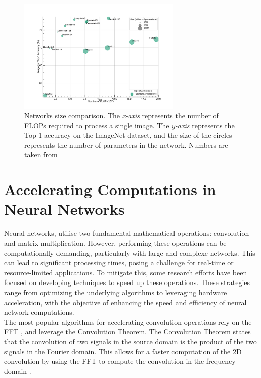 \begin{figure}[htbp]
    \centering
    \includegraphics[width=0.7\textwidth]{chapter_sota/assets/network_sizes_normal.pdf}
    \caption{Networks size comparison. The \emph{x-axis} represents the number
    of \acp{FLOP} required to process a single image. The \emph{y-axis}
    represents the Top-1 accuracy on the ImageNet \cite{deng2009imagenet}
    dataset, and the size of the circles represents the number of parameters in
    the network. Numbers are taken from \cite{pytorch_vision}}
    \label{fig:sota:net_sizes}
\end{figure}

\section{Accelerating Computations in Neural Networks}
\label{sec:sota:fast_convolutions}


Neural networks, utilise two fundamental mathematical operations: convolution
and matrix multiplication. However, performing these operations can be
computationally demanding, particularly with large and complexe networks. This
can lead to significant processing times, posing a challenge for real-time or
resource-limited applications. To mitigate this, some research efforts have been
focused on developing techniques to speed up these operations. These strategies
range from optimizing the underlying algorithms to leveraging hardware
acceleration, with the objective of enhancing the speed and efficiency of neural
network computations.\\


The most popular algorithms for accelerating convolution operations rely on the
\ac{FFT}
\cite{DBLP:conf/nips/ChiJM20,DBLP:journals/npl/LinY19,DBLP:conf/pkdd/PrattWCZ17},
and leverage the Convolution Theorem. The Convolution Theorem states that the
convolution of two signals in the source domain is the product of the two
signals in the Fourier domain. This allows for a faster computation of the 2D
convolution by using the \ac{FFT} to compute the convolution in the frequency
domain \cite{oppenheim1997signals}.\\


